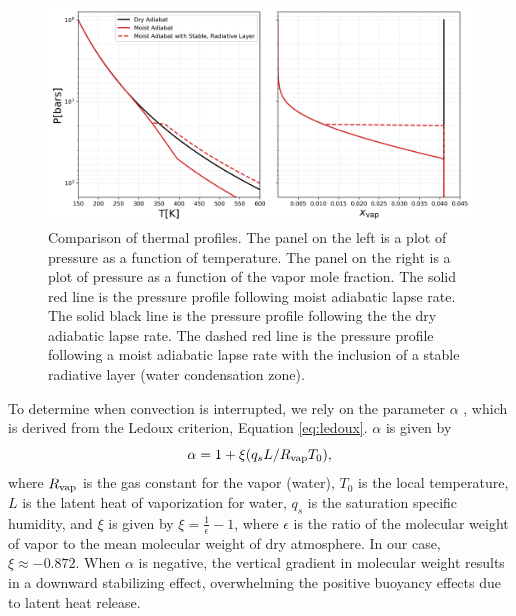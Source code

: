 \documentclass[11pt]{ucscthesisbs}
\begin{document}
\begin{figure}[ht!]
 \centerline{
  \includegraphics[width=6.5in]{figures/comparison_dry_vs_moist_lapse_rates.png}
 }
\caption[A Standard Interior Structure Model]
{Comparison of thermal profiles. The panel on the left is a plot of pressure as a function of temperature. The panel on the right is a plot of pressure as a function of the vapor mole fraction. The solid red line is the pressure profile following moist adiabatic lapse rate. The solid black line is the pressure profile following the the dry adiabatic lapse rate. The dashed red line is the pressure profile following a moist adiabatic lapse rate with the inclusion of a stable radiative layer (water condensation zone).} 
\label{fig:comparison_adiabatic_profiles}
\end{figure}
To determine when convection is interrupted, we rely on the parameter $\alpha$ \citep{friedson_2017}, which is derived from the Ledoux criterion, Equation \ref{eq:ledoux}. $\alpha$ is given by
\begin{equation}
  \alpha = 1 + \xi (q_{s} L / R_{\rm vap} T_{0}) ,
  \label{eq:alpha}
\end{equation}
where $R_{\rm vap}$ is the gas constant for the vapor (water), $T_{0}$ is the local temperature, $L$ is the latent heat of vaporization for water, $q_{s}$ is the saturation specific humidity, and $\xi$ is given by $\xi = \frac{1}{\epsilon} - 1$, where $\epsilon$ is the ratio of the molecular weight of vapor to the mean molecular weight of dry atmosphere. In our case, $\xi \approx -0.872$. When $\alpha$ is negative, the vertical gradient in molecular weight results in a downward stabilizing effect, overwhelming the positive buoyancy effects due to latent heat release.
\end{document}
